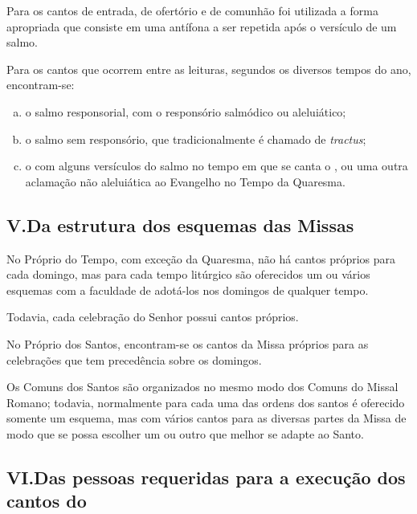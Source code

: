  Para os cantos de entrada, de ofertório e de comunhão foi utilizada a forma apropriada que consiste em uma antífona a ser repetida após o versículo de um salmo.

 Para os cantos que ocorrem entre as leituras, segundos os diversos tempos do ano, encontram-se:
\begin{enumerate}[a)]
  \item o salmo responsorial, com o responsório salmódico ou aleluiático;

  \item o salmo sem responsório, que tradicionalmente é chamado de \emph{tractus};

  \item o {\Al} com alguns versículos do salmo no tempo em que se canta o \textcolor{gregoriocolor}{\Al}, ou uma outra aclamação não aleluiática ao Evangelho no Tempo da Quaresma.
\end{enumerate}

\subsection*{V.\@ Da estrutura dos esquemas das Missas}\label{subsection*:praenotanda-5}

 No Próprio do Tempo, com exceção da Quaresma, não há cantos próprios para cada domingo, mas para cada tempo litúrgico são oferecidos um ou vários esquemas com a faculdade de adotá-los nos domingos de qualquer tempo.

Todavia, cada celebração do Senhor possui cantos próprios.

 No Próprio dos Santos, encontram-se os cantos da Missa próprios para as celebrações que tem precedência sobre os domingos.

 Os Comuns dos Santos são organizados no mesmo modo dos Comuns do Missal Romano; todavia, normalmente para cada uma das ordens dos santos é oferecido somente um esquema, mas com vários cantos para as diversas partes da Missa de modo que se possa escolher um ou outro que melhor se adapte ao Santo.

\subsection*{VI.\@ Das pessoas requeridas para a execução dos cantos do {\GS}}

